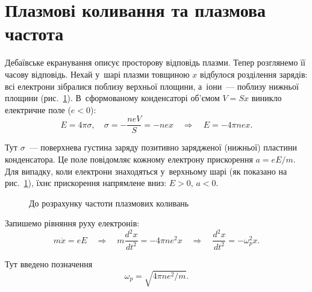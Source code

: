\section{Плазмові коливання та плазмова частота}\label{sec:plasma-oscillations}

Дебаївське екранування описує просторову відповідь плазми. Тепер розглянемо її часову відповідь. Нехай у~шарі плазми товщиною $x$ відбулося розділення зарядів: всі електрони зібралися поблизу верхньої площини, а~іони~--- поблизу нижньої площини (рис.~\ref{pic:plasma-oscillations}). В~сформованому конденсаторі об'ємом $V = Sx$ виникло електричне поле ($e < 0$):
\begin{equation*}
	E = 4\pi\sigma, \quad \sigma = -\frac{neV}{S} = -nex \quad\Rightarrow\quad E = -4\pi nex.
\end{equation*}

Тут $\sigma$~--- поверхнева густина заряду позитивно зарядженої (нижньої) пластини конденсатора. Це поле повідомляє кожному електрону прискорення $a = eE/m$. Для випадку, коли електрони знаходяться у~верхньому шарі (як показано на рис.~\ref{pic:plasma-oscillations}), їхнє прискорення напрямлене вниз: $E > 0$, $a < 0$.

\begin{figure}[h!]\centering
	\caption{До розрахунку частоти плазмових коливань}
	\label{pic:plasma-oscillations}
\end{figure}

Запишемо рівняння руху електронів:
\begin{equation}\label{eq:plasma-oscillation-eq}
	m\ddot{x} = eE \quad\Rightarrow\quad m\frac{d^2x}{dt^2} = -4\pi ne^2 x \quad\Rightarrow\quad \frac{d^2x}{dt^2} = -\omega_p^2 x.
\end{equation}

Тут введено позначення
\begin{equation}\label{eq:plasma-frequency}
	\omega_p = \sqrt{4\pi ne^2/m}.
\end{equation}

